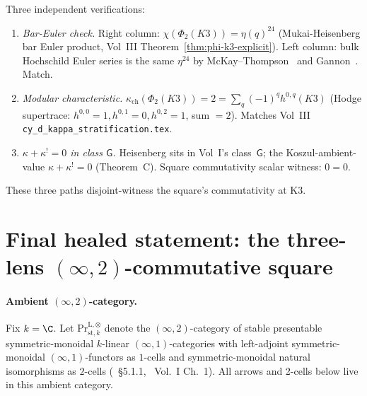 Three independent verifications:
\begin{enumerate}
 \item \emph{Bar-Euler check.} Right column:
 $\chi(\Phi_2(K3)) = \eta(q)^{24}$ (Mukai-Heisenberg bar Euler product,
 Vol~III Theorem~\ref{thm:phi-k3-explicit}). Left column: bulk
 Hochschild Euler series is the same $\eta^{24}$ by
 McKay--Thompson~\cite{ConwayNorton1979} and
 Gannon~\cite{Gannon2006}. Match.
 \item \emph{Modular characteristic.}
 $\kappa_{\mathrm{ch}}(\Phi_2(K3)) = 2 = \sum_q (-1)^q h^{0,q}(K3)$
 (Hodge supertrace: $h^{0,0}=1, h^{0,1}=0, h^{0,2}=1$, sum $=2$). Matches
 Vol~III
 \texttt{cy\_d\_kappa\_stratification.tex}.
 \item \emph{$\kappa+\kappa^!=0$ in class $\mathsf{G}$.}
 Heisenberg sits in Vol~I's class~$\mathsf{G}$; the Koszul-ambient-value
 $\kappa+\kappa^! = 0$ (Theorem~C).
 Square commutativity scalar witness: $0 = 0$.
\end{enumerate}
These three paths disjoint-witness the square's commutativity at K3.


\section*{Final healed statement: the three-lens $(\infty,2)$-commutative
square}

\paragraph*{Ambient $(\infty,2)$-category.} Fix $k = \C$. Let
$\mathrm{Pr}^{\mathrm{L},\otimes}_{\mathrm{st},k}$ denote the
$(\infty,2)$-category of stable presentable symmetric-monoidal
$k$-linear $(\infty,1)$-categories with left-adjoint
symmetric-monoidal $(\infty,1)$-functors as $1$-cells and
symmetric-monoidal natural isomorphisms as $2$-cells
(\cite{LurieHA}~\S 5.1.1, \cite{GaitsgoryRozenblyum2019}~Vol.~I
Ch.~1). All arrows and 2-cells below live in this ambient category.

